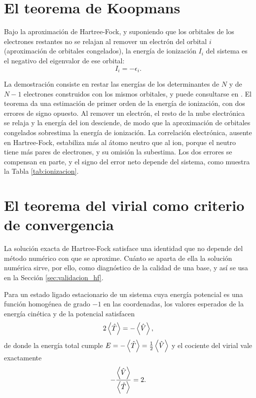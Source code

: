 \section{El teorema de Koopmans}
\label{sec:koopmans_theorem}

\begin{theorem}
Bajo la aproximación de Hartree-Fock, y suponiendo que los orbitales de los electrones restantes no se relajan al remover un electrón del orbital $i$ (aproximación de orbitales congelados), la energía de ionización $I_i$ del sistema es el negativo del eigenvalor de ese orbital:
\begin{equation}
    I_i = -\epsilon_i.
\end{equation}
\end{theorem}

La demostración consiste en restar las energías de los determinantes de $N$ y de $N-1$ electrones construidos con los mismos orbitales, y puede consultarse en \textcite[Sección 3.3]{Szabo1989}. El teorema da una estimación de primer orden de la energía de ionización, con dos errores de signo opuesto. Al remover un electrón, el resto de la nube electrónica se relaja y la energía del ion desciende, de modo que la aproximación de orbitales congelados sobrestima la energía de ionización. La correlación electrónica, ausente en Hartree-Fock, estabiliza más al átomo neutro que al ion, porque el neutro tiene más pares de electrones, y su omisión la subestima. Los dos errores se compensan en parte, y el signo del error neto depende del sistema, como muestra la Tabla \ref{tab:ionizacion}.

\section{El teorema del virial como criterio de convergencia}
\label{sec:virial}

La solución exacta de Hartree-Fock satisface una identidad que no depende del método numérico con que se aproxime. Cuánto se aparta de ella la solución numérica sirve, por ello, como diagnóstico de la calidad de una base, y así se usa en la Sección \ref{sec:validacion_hf}.

\begin{theorem}
Para un estado ligado estacionario de un sistema cuya energía potencial es una función homogénea de grado $-1$ en las coordenadas, los valores esperados de la energía cinética y de la potencial satisfacen
\begin{equation}
    \label{eq:virial}
    2\ev{\hat{T}} = -\ev{\hat{V}},
\end{equation}
de donde la energía total cumple $E = -\ev{\hat{T}} = \tfrac{1}{2}\ev{\hat{V}}$ y el cociente del virial vale exactamente
\begin{equation}
    \label{eq:cociente_virial}
    -\frac{\ev{\hat{V}}}{\ev{\hat{T}}} = 2.
\end{equation}
\end{theorem}

